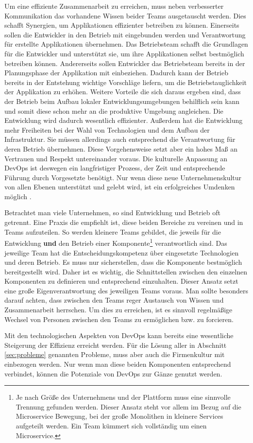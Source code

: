 Um eine effiziente Zusammenarbeit zu erreichen, muss neben verbesserter Kommunikation das vorhandene Wissen beider Teams ausgetauscht werden. Dies schafft Synergien, um Applikationen effizienter betreiben zu können. Einerseits sollen die Entwickler in den Betrieb mit eingebunden werden und Verantwortung für erstellte Applikationen übernehmen. Das Betriebsteam schafft die Grundlagen für die Entwickler und unterstützt sie, um ihre Applikationen selbst bestmöglich betreiben können. Andererseits sollen Entwickler das Betriebsteam bereits in der Planungsphase der Applikation mit einbeziehen. Dadurch kann der Betrieb bereits in der Entstehung wichtige Vorschläge liefern, um die Betriebstauglichkeit der Applikation zu erhöhen.
Weitere Vorteile die sich daraus ergeben sind, dass der Betrieb beim Aufbau lokaler Entwicklungsumgebungen behilflich sein kann und somit diese schon mehr an die produktive Umgebung angleichen. Die Entwicklung wird dadurch wesentlich effizienter. Außerdem hat die Entwicklung mehr Freiheiten bei der Wahl von Technologien und dem Aufbau der Infrastruktur. Sie müssen allerdings auch entsprechend die Verantwortung für deren Betrieb übernehmen. Diese Vorgehensweise setzt aber ein hohes Maß an Vertrauen und Respekt untereinander voraus. Die kulturelle Anpassung an DevOps ist deswegen ein langfristiger Prozess, der Zeit und entsprechende Führung durch Vorgesetzte benötigt. Nur wenn diese neue Unternehmenskultur von allen Ebenen unterstützt und gelebt wird, ist ein erfolgreiches Umdenken möglich \cite{walls2013}.

Betrachtet man viele Unternehmen, so sind Entwicklung und Betrieb oft getrennt. Eine Praxis die \cite{wolff2014} empfiehlt ist, diese beiden Bereiche zu vereinen und in Teams aufzuteilen. So werden kleinere Teams gebildet, die jeweils für die Entwicklung \textbf{und} den Betrieb einer Komponente\footnote{Je nach Größe des Unternehmens und der Plattform muss eine sinnvolle Trennung gefunden werden. Dieser Ansatz steht vor allem im Bezug auf die Microservice Bewegung, bei der große Monolithen in kleinere Services aufgeteilt werden. Ein Team kümmert sich vollständig um einen Microservice.} verantwortlich sind. Das jeweilige Team hat die Entscheidungskompetenz über eingesetzte Technologien und deren Betrieb. Es muss nur sicherstellen, dass die Komponente bestmöglich bereitgestellt wird. Daher ist es wichtig, die Schnittstellen zwischen den einzelnen Komponenten zu definieren und entsprechend einzuhalten. Dieser Ansatz setzt eine große Eigenverantwortung des jeweiligen Teams voraus. Man sollte besonders darauf achten, dass zwischen den Teams reger Austausch von Wissen und Zusammenarbeit herrschen. Um dies zu erreichen, ist es sinnvoll regelmäßige Wechsel von Personen zwischen den Teams zu ermöglichen bzw. zu forcieren.

Mit den technologischen Aspekten von DevOps kann bereits eine wesentliche Steigerung der Effizienz erreicht werden. Für die Lösung aller in Abschnitt \ref{sec:probleme} genannten Probleme, muss aber auch die Firmenkultur mit einbezogen werden. Nur wenn man diese beiden Komponenten entsprechend verbindet, können die Potenziale von DevOps zur Gänze genutzt werden.